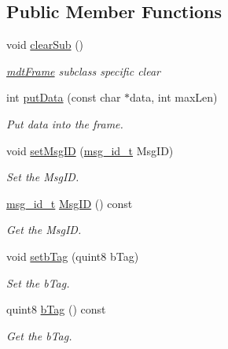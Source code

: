 \subsection*{Public Member Functions}
\begin{DoxyCompactItemize}
\item 
\hypertarget{classmdt_frame_usb_tmc_afb0b0e071e328b55ce8e2c73359153d6}{
void \hyperlink{classmdt_frame_usb_tmc_afb0b0e071e328b55ce8e2c73359153d6}{clearSub} ()}
\label{classmdt_frame_usb_tmc_afb0b0e071e328b55ce8e2c73359153d6}

\begin{DoxyCompactList}\small\item\em \hyperlink{classmdt_frame}{mdtFrame} subclass specific clear \end{DoxyCompactList}\item 
int \hyperlink{classmdt_frame_usb_tmc_a06d2743a113bd2b4cf2ee44014ecd710}{putData} (const char $\ast$data, int maxLen)
\begin{DoxyCompactList}\small\item\em Put data into the frame. \end{DoxyCompactList}\item 
void \hyperlink{classmdt_frame_usb_tmc_a19121b03cbb4c1bb420dc3cdb132f703}{setMsgID} (\hyperlink{classmdt_frame_usb_tmc_a10c2216157b0616b69f6cabc5c8e253b}{msg\_\-id\_\-t} MsgID)
\begin{DoxyCompactList}\small\item\em Set the MsgID. \end{DoxyCompactList}\item 
\hyperlink{classmdt_frame_usb_tmc_a10c2216157b0616b69f6cabc5c8e253b}{msg\_\-id\_\-t} \hyperlink{classmdt_frame_usb_tmc_a384a13bd456e6827868a17810d628a4a}{MsgID} () const 
\begin{DoxyCompactList}\small\item\em Get the MsgID. \end{DoxyCompactList}\item 
void \hyperlink{classmdt_frame_usb_tmc_aff7b19ad83013402dd115089d31b8642}{setbTag} (quint8 bTag)
\begin{DoxyCompactList}\small\item\em Set the bTag. \end{DoxyCompactList}\item 
quint8 \hyperlink{classmdt_frame_usb_tmc_a471c97b844331376ed1801cdb50f5cc6}{bTag} () const 
\begin{DoxyCompactList}\small\item\em Get the bTag. \end{DoxyCompactList}\item 

\end{DoxyCompactItemize}
